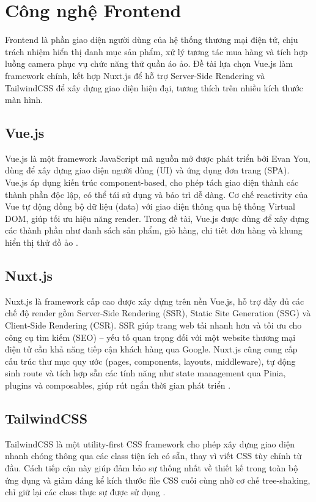 \section{Công nghệ Frontend}

Frontend là phần giao diện người dùng của hệ thống thương mại điện tử, chịu trách nhiệm hiển thị danh mục sản phẩm, xử lý tương tác mua hàng và tích hợp luồng camera phục vụ chức năng thử quần áo ảo. Đề tài lựa chọn Vue.js làm framework chính, kết hợp Nuxt.js để hỗ trợ Server-Side Rendering và TailwindCSS để xây dựng giao diện hiện đại, tương thích trên nhiều kích thước màn hình.

\subsection{Vue.js}
Vue.js là một framework JavaScript mã nguồn mở được phát triển bởi Evan You, dùng để xây dựng giao diện người dùng (UI) và ứng dụng đơn trang (SPA). Vue.js áp dụng kiến trúc component-based, cho phép tách giao diện thành các thành phần độc lập, có thể tái sử dụng và bảo trì dễ dàng. Cơ chế reactivity của Vue tự động đồng bộ dữ liệu (data) với giao diện thông qua hệ thống Virtual DOM, giúp tối ưu hiệu năng render. Trong đề tài, Vue.js được dùng để xây dựng các thành phần như danh sách sản phẩm, giỏ hàng, chi tiết đơn hàng và khung hiển thị thử đồ ảo \cite{vuejs_docs}.

\subsection{Nuxt.js}
Nuxt.js là framework cấp cao được xây dựng trên nền Vue.js, hỗ trợ đầy đủ các chế độ render gồm Server-Side Rendering (SSR), Static Site Generation (SSG) và Client-Side Rendering (CSR). SSR giúp trang web tải nhanh hơn và tối ưu cho công cụ tìm kiếm (SEO) -- yếu tố quan trọng đối với một website thương mại điện tử cần khả năng tiếp cận khách hàng qua Google. Nuxt.js cũng cung cấp cấu trúc thư mục quy ước (pages, components, layouts, middleware), tự động sinh route và tích hợp sẵn các tính năng như state management qua Pinia, plugins và composables, giúp rút ngắn thời gian phát triển \cite{nuxt_assets}.

\subsection{TailwindCSS}
TailwindCSS là một utility-first CSS framework cho phép xây dựng giao diện nhanh chóng thông qua các class tiện ích có sẵn, thay vì viết CSS tùy chỉnh từ đầu. Cách tiếp cận này giúp đảm bảo sự thống nhất về thiết kế trong toàn bộ ứng dụng và giảm đáng kể kích thước file CSS cuối cùng nhờ cơ chế tree-shaking, chỉ giữ lại các class thực sự được sử dụng \cite{tailwindcss_docs}.

